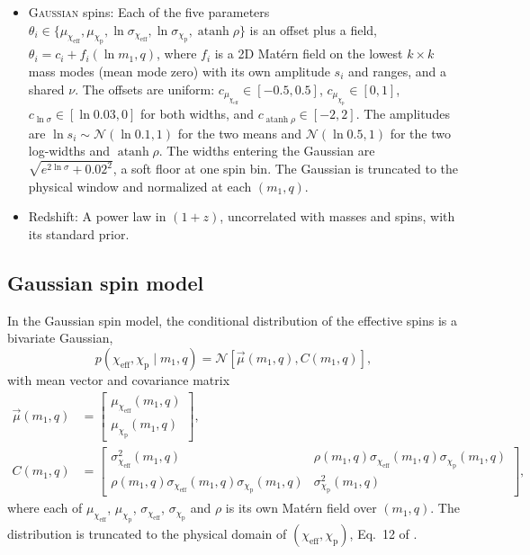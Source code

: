 \documentclass[%
 reprint,
 amsmath,amssymb,
 aps,
 prl,
 nofootinbib,nobibnotes,
]{revtex4-2}
\newcommand{\chieff}{\ensuremath{\chi_{\mathrm{eff}}}}
\newcommand{\chip}{\ensuremath{\chi_{\mathrm{p}}}}
\newcommand{\gaussianspins}{\textsc{Gaussian}\xspace}
\begin{document}
{\begin{itemize}
\item \gaussianspins spins: Each of the five parameters $\theta_i \in \{\mu_{\chieff}, \mu_{\chip}, \ln\sigma_{\chieff}, \ln\sigma_{\chip}, \operatorname{atanh}\rho\}$ is an offset plus a field, $\theta_i = c_i + f_i(\ln m_1, q)$, where $f_i$ is a 2D Mat\'ern field on the lowest $k \times k$ mass modes (mean mode zero) with its own amplitude $s_i$ and ranges, and a shared $\nu$. The offsets are uniform: $c_{\mu_{\chieff}} \in [-0.5, 0.5]$, $c_{\mu_{\chip}} \in [0, 1]$, $c_{\ln\sigma} \in [\ln 0.03, 0]$ for both widths, and $c_{\operatorname{atanh}\rho} \in [-2, 2]$. The amplitudes are $\ln s_i \sim \mathcal{N}(\ln 0.1, 1)$ for the two means and $\mathcal{N}(\ln 0.5, 1)$ for the two log-widths and $\operatorname{atanh}\rho$. The widths entering the Gaussian are $\sqrt{e^{2\ln\sigma} + 0.02^2}$, a soft floor at one spin bin. The Gaussian is truncated to the physical window and normalized at each $(m_1, q)$.
\item Redshift: A power law in $(1+z)$, uncorrelated with masses and spins, with its standard prior.
\end{itemize}}

\subsection*{Gaussian spin model}

In the Gaussian spin model, the conditional distribution of the effective spins is a bivariate Gaussian,
\begin{equation}
    p(\chieff, \chip \mid m_1, q) = \mathcal{N}\left[
    \vec{\mu}(m_1, q), 
    C(m_1, q)
    \right],
\end{equation}
with mean vector and covariance matrix
\begin{align}
    \vec{\mu}(m_1, q) &= \begin{bmatrix}
    \mu_{\chieff}(m_1, q) \\ 
    \mu_{\chip}(m_1, q)
    \end{bmatrix},
    \\
    C(m_1, q) &= \begin{bmatrix}
    \sigma^2_{\chieff}(m_1, q) & \rho(m_1, q)\sigma_{\chieff}(m_1, q)\sigma_{\chip}(m_1, q) \\ 
    \rho(m_1, q)\sigma_{\chieff}(m_1, q)\sigma_{\chip}(m_1, q) & \sigma^2_{\chip}(m_1, q)
    \end{bmatrix}, \label{eq: gaussian cov}
\end{align}
where each of $\mu_{\chieff}$, $\mu_{\chip}$, $\sigma_{\chieff}$, $\sigma_{\chip}$ and $\rho$ is its own Mat\'ern field over $(m_1, q)$. The distribution is truncated to the physical domain of $(\chieff, \chip)$, Eq.~12 of \citet{iwaya_analytic_2025}.
\end{document}
